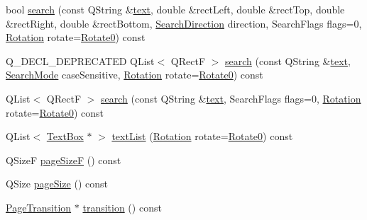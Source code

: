 \begin{DoxyCompactItemize}
\item 
bool \hyperlink{class_poppler_1_1_page_a4a631b42cef039ef38e0e0131e845e75}{search} (const Q\+String \&\hyperlink{class_poppler_1_1_page_afbf36f00fbfd391b131ed3cb8fb9b848}{text}, double \&rect\+Left, double \&rect\+Top, double \&rect\+Right, double \&rect\+Bottom, \hyperlink{class_poppler_1_1_page_a693343ece22aa954a6357e97625e7c93}{Search\+Direction} direction, Search\+Flags flags=0, \hyperlink{class_poppler_1_1_page_a9c9a4e1bc301cd2ab4eac0b51f0dc0ec}{Rotation} rotate=\hyperlink{class_poppler_1_1_page_a9c9a4e1bc301cd2ab4eac0b51f0dc0eca6bd60f29c8d73b686ceb2030964823db}{Rotate0}) const
\item 
Q\+\_\+\+D\+E\+C\+L\+\_\+\+D\+E\+P\+R\+E\+C\+A\+T\+ED Q\+List$<$ Q\+RectF $>$ \hyperlink{class_poppler_1_1_page_a915e7bd24ca1a801c7c3f333790eb6bd}{search} (const Q\+String \&\hyperlink{class_poppler_1_1_page_afbf36f00fbfd391b131ed3cb8fb9b848}{text}, \hyperlink{class_poppler_1_1_page_ab14d06b2fea7e363fc10877e7f0c759a}{Search\+Mode} case\+Sensitive, \hyperlink{class_poppler_1_1_page_a9c9a4e1bc301cd2ab4eac0b51f0dc0ec}{Rotation} rotate=\hyperlink{class_poppler_1_1_page_a9c9a4e1bc301cd2ab4eac0b51f0dc0eca6bd60f29c8d73b686ceb2030964823db}{Rotate0}) const
\item 
Q\+List$<$ Q\+RectF $>$ \hyperlink{class_poppler_1_1_page_ad15b7f8792bf09a385daeae40e1f6d0b}{search} (const Q\+String \&\hyperlink{class_poppler_1_1_page_afbf36f00fbfd391b131ed3cb8fb9b848}{text}, Search\+Flags flags=0, \hyperlink{class_poppler_1_1_page_a9c9a4e1bc301cd2ab4eac0b51f0dc0ec}{Rotation} rotate=\hyperlink{class_poppler_1_1_page_a9c9a4e1bc301cd2ab4eac0b51f0dc0eca6bd60f29c8d73b686ceb2030964823db}{Rotate0}) const
\item 
Q\+List$<$ \hyperlink{class_poppler_1_1_text_box}{Text\+Box} $\ast$ $>$ \hyperlink{class_poppler_1_1_page_a90a0d1665c9298f25c573617ca859c43}{text\+List} (\hyperlink{class_poppler_1_1_page_a9c9a4e1bc301cd2ab4eac0b51f0dc0ec}{Rotation} rotate=\hyperlink{class_poppler_1_1_page_a9c9a4e1bc301cd2ab4eac0b51f0dc0eca6bd60f29c8d73b686ceb2030964823db}{Rotate0}) const
\item 
Q\+SizeF \hyperlink{class_poppler_1_1_page_a2493727bf6c299a6ce2bd9e1387417bd}{page\+SizeF} () const
\item 
Q\+Size \hyperlink{class_poppler_1_1_page_ab8ec6ce478c903505f6b041200ba5f4a}{page\+Size} () const
\item 
\hyperlink{class_poppler_1_1_page_transition}{Page\+Transition} $\ast$ \hyperlink{class_poppler_1_1_page_aff7331566a9cbf659f625f73ee05f746}{transition} () const

\end{DoxyCompactItemize}
